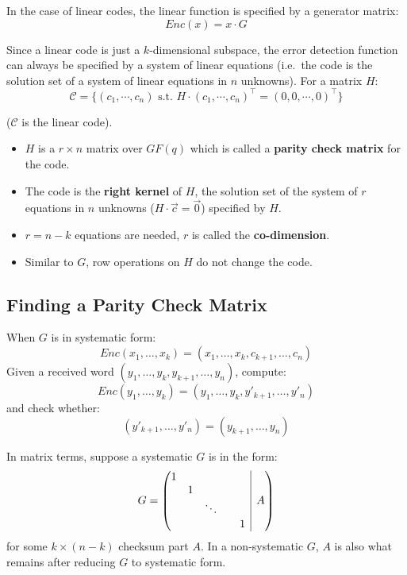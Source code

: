 \documentclass[11pt]{article}
\begin{document}
In the case of linear codes, the linear function is specified by a generator matrix: 
\[
  Enc(x) = x \cdot G
\]

Since a linear code is just a $k$-dimensional subspace, the error detection function can always be specified by a system of linear equations (i.e.\ the code is the solution set of a system of linear equations in $n$ unknowns).
For a matrix $H$:
\[
  \mathcal{C} = \{ (c_1, \cdots, c_n) \text{ s.t.\ } H \cdot (c_1, \cdots, c_n)^\intercal = (0, 0, \cdots, 0)^\intercal \}
\]

($\mathcal{C}$ is the linear code).

\begin{itemize}
  \item $H$ is a $r \times n$ matrix over $GF(q)$ which is called a \textbf{parity check matrix} for the code.
  \item The code is the \textbf{right kernel} of $H$, the solution set of the system of $r$ equations in $n$ unknowns ($H \cdot \overrightarrow{c} = \overrightarrow{0}$) specified by $H$.
  \item $r = n - k$ equations are needed, $r$ is called the \textbf{co-dimension}.
  \item Similar to $G$, row operations on $H$ do not change the code.
\end{itemize}

\subsection{Finding a Parity Check Matrix}
When $G$ is in systematic form:
\[
  Enc(x_1, \ldots, x_k) = (x_1, \ldots, x_k, c_{k + 1}, \ldots, c_n)
\]
Given a received word $(y_1, \ldots, y_k, y_{k + 1}, \ldots, y_n)$, compute:
\[
	Enc(y_1, \ldots, y_k) = (y_1, \ldots, y_k, y'_{k + 1}, \ldots, y'_n)
\]
and check whether:
\[
	(y'_{k + 1}, \ldots, y'_n) =  (y_{k + 1}, \ldots, y_n)
\]

In matrix terms, suppose a systematic $G$ is in the form:
\[
  G = 
  \left( \begin{array}{@{}c|c@{}}
     \begin{matrix}
        1 & & & \\
        & 1 & & \\
        & & \ddots & \\
        & & & & 1
     \end{matrix} 
        & A
  \end{array} \right)
\]
for some $k \times (n - k)$ checksum part $A$.
In a non-systematic $G$, $A$ is also what remains after reducing $G$ to systematic form.
\end{document}
